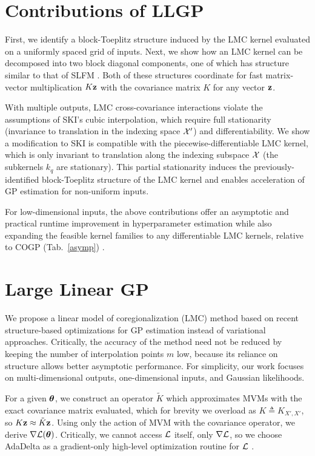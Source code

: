 \documentclass{article}
\begin{document}
\section{Contributions of LLGP}\label{sec:contributions}

First, we identify a block-Toeplitz structure induced by the LMC kernel evaluated on a uniformly spaced grid of inputs. Next, we show how an LMC kernel can be decomposed into two block diagonal components, one of which has structure similar to that of SLFM \cite{seeger2005semiparametric}. Both of these structures coordinate for fast matrix-vector multiplication $K\textbf{z}$ with the covariance matrix $K$ for any vector $\textbf{z}$.

With multiple outputs, LMC cross-covariance interactions violate the assumptions of SKI's cubic interpolation, which require full stationarity (invariance to translation in the indexing space $\mathcal{X}'$) and differentiability. We show a modification to SKI is compatible with the piecewise-differentiable LMC kernel, which is only invariant to translation along the indexing subspace $\mathcal{X}$ (the subkernels $k_q$ are stationary). This partial stationarity induces the previously-identified block-Toeplitz structure of the LMC kernel and enables acceleration of GP estimation for non-uniform inputs.

For low-dimensional inputs, the above contributions offer an asymptotic and practical runtime improvement in hyperparameter estimation while also expanding the feasible kernel families to any differentiable LMC kernels, relative to COGP (Tab.~\ref{asymp}) \cite{nguyen2014collaborative}.

\section{Large Linear GP} \label{sec:matrix-free}

We propose a linear model of coregionalization (LMC) method based on recent structure-based optimizations for GP estimation instead of variational approaches. Critically, the accuracy of the method need not be reduced by keeping the number of interpolation points $m$ low, because its reliance on structure allows better asymptotic performance.
For simplicity, our work focuses on multi-dimensional outputs, one-dimensional inputs, and Gaussian likelihoods.

For a given ${\boldsymbol\theta}$, we construct an operator $\tilde{K}$ which approximates MVMs with the exact covariance matrix evaluated, which for brevity we overload as $K\triangleq K_{X',X'}$, so $K\textbf{z}\approx \tilde{K}\textbf{z}$. Using only the action of MVM with the covariance operator, we derive $\nabla\mathcal{L}({\boldsymbol\theta})$. Critically, we cannot access $\mathcal{L}$ itself, only $\nabla\mathcal{L}$, so we choose AdaDelta as a gradient-only high-level optimization routine for $\mathcal{L}$ \cite{zeiler2012adadelta}.
\end{document}
